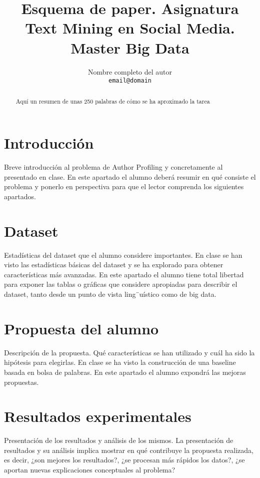 \documentclass[11pt,a4paper]{article}
\title{Esquema de paper. Asignatura Text Mining en Social Media. Master Big Data}
\author{Nombre completo del autor \\
  {\tt email@domain} \\}
\date{}
\begin{document}
\maketitle
\begin{abstract}
  Aqu\'i un resumen de unas 250 palabras de c\'omo se ha aproximado la tarea
\end{abstract}


\section{Introducción}

Breve introducci\'on al problema de Author Profiling y concretamente al presentado en clase. En este apartado el alumno deber\'a resumir en qu\'e consiste el problema y ponerlo en perspectiva para que el lector comprenda los siguientes apartados.


\section{Dataset}

Estad\'isticas del dataset que el alumno considere importantes. En clase se han visto las estad\'isticas b\'asicas del dataset y se ha explorado para obtener caracter\'isticas m\'as avanzadas. En este apartado el alumno tiene total libertad para exponer las tablas o gr\'aficas que considere apropiadas para describir el dataset, tanto desde un punto de vista ling¨u\'istico como de big data. 


\section{Propuesta del alumno}

Descripci\'on de la propuesta. Qu\'e caracter\'isticas se han utilizado y cu\'al ha sido la hip\'otesis para elegirlas. En clase se ha visto la construcci\'on de una baseline basada en bolsa de palabras. En este apartado el alumno expondr\'a las mejoras propuestas.

\section{Resultados experimentales}

Presentaci\'on de los resultados y an\'alisis de los mismos. La presentaci\'on de resultados y su an\'alisis implica mostrar en qu\'e contribuye la propuesta realizada, es decir, ¿son mejores los resultados?, ¿se procesan m\'as r\'apidos los datos?, ¿se aportan nuevas explicaciones conceptuales al problema?
\end{document}
